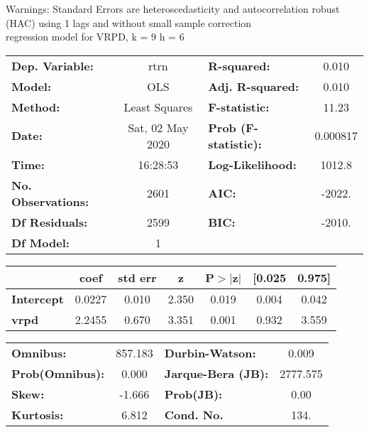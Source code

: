 Warnings: \newline
 [1] Standard Errors are heteroscedasticity and autocorrelation robust (HAC) using 1 lags and without small sample correction\\ 

regression model for VRPD, k = 9 h = 6\begin{center}
\begin{tabular}{lclc}
\toprule
\textbf{Dep. Variable:}    &       rtrn       & \textbf{  R-squared:         } &     0.010   \\
\textbf{Model:}            &       OLS        & \textbf{  Adj. R-squared:    } &     0.010   \\
\textbf{Method:}           &  Least Squares   & \textbf{  F-statistic:       } &     11.23   \\
\textbf{Date:}             & Sat, 02 May 2020 & \textbf{  Prob (F-statistic):} &  0.000817   \\
\textbf{Time:}             &     16:28:53     & \textbf{  Log-Likelihood:    } &    1012.8   \\
\textbf{No. Observations:} &        2601      & \textbf{  AIC:               } &    -2022.   \\
\textbf{Df Residuals:}     &        2599      & \textbf{  BIC:               } &    -2010.   \\
\textbf{Df Model:}         &           1      & \textbf{                     } &             \\
\bottomrule
\end{tabular}
\begin{tabular}{lcccccc}
                   & \textbf{coef} & \textbf{std err} & \textbf{z} & \textbf{P$> |$z$|$} & \textbf{[0.025} & \textbf{0.975]}  \\
\midrule
\textbf{Intercept} &       0.0227  &        0.010     &     2.350  &         0.019        &        0.004    &        0.042     \\
\textbf{vrpd}      &       2.2455  &        0.670     &     3.351  &         0.001        &        0.932    &        3.559     \\
\bottomrule
\end{tabular}
\begin{tabular}{lclc}
\textbf{Omnibus:}       & 857.183 & \textbf{  Durbin-Watson:     } &    0.009  \\
\textbf{Prob(Omnibus):} &   0.000 & \textbf{  Jarque-Bera (JB):  } & 2777.575  \\
\textbf{Skew:}          &  -1.666 & \textbf{  Prob(JB):          } &     0.00  \\
\textbf{Kurtosis:}      &   6.812 & \textbf{  Cond. No.          } &     134.  \\
\bottomrule
\end{tabular}
\end{center}

